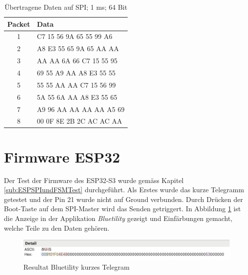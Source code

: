 \begin{table}[H]
    \centering
    \begin{tabular}{c||l}
        \toprule
        \textbf{Packet} & \textbf{Data} \\ 
        \midrule
        1 & C7 15 56 9A 65 55 99 A6 \\
        2 & A8 E3 55 65 9A 65 AA AA \\
        3 & AA AA 6A 66 C7 15 55 95 \\
        4 & 69 55 A9 AA A8 E3 55 55 \\
        5 & 55 55 AA AA C7 15 56 99 \\
        6 & 5A 55 6A AA A8 E3 55 65 \\
        7 & A9 96 AA AA AA AA A5 69 \\
        8 & 00 0F 8E 2B 2C AC AC AA \\
        \bottomrule
    \end{tabular}
    \caption{Übertragene Daten auf SPI; 1 ms; 64 Bit}
    \label{tab:data_table}
\end{table}





\section{Firmware ESP32}
\label{sec:ResultatESP32}

Der Test der Firmware des ESP32-S3 wurde gemäss Kapitel \ref{sub:ESPSPIundFSMTest} durchgeführt. Als Erstes wurde das kurze Telegramm getestet und der Pin 21 wurde nicht auf Ground verbunden. Durch Drücken der Boot-Taste auf dem SPI-Master wird das Senden getriggert. In Abbildung \ref{fig:ResultatBLEKurz} ist die Anzeige in der Applikation \textit{Bluetility} gezeigt und Einfärbungen gemacht, welche Teile zu den Daten gehören.

\begin{figure}[H]
    \centering
    \includegraphics[width=0.9\linewidth]{Figures/Chap4/ESP32/Resultat_BLE_kurz.png}
    \caption{Resultat Bluetility kurzes Telegram}
    \label{fig:ResultatBLEKurz}
\end{figure}


